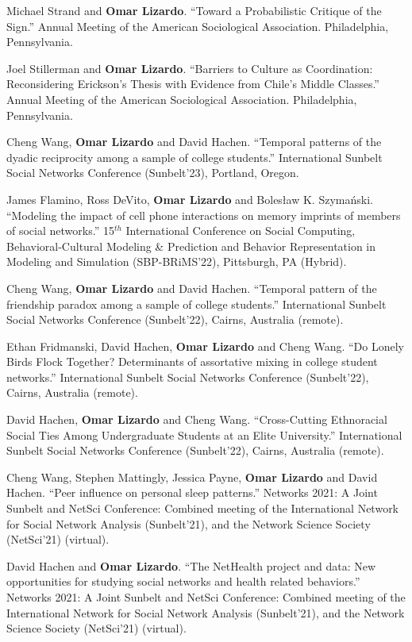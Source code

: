 \ind Michael Strand and {\bf Omar Lizardo}. ``Toward a Probabilistic Critique of the Sign.'' Annual Meeting of the American Sociological Association. Philadelphia, Pennsylvania. 

\ind Joel Stillerman and {\bf Omar Lizardo}. ``Barriers to Culture as Coordination: Reconsidering Erickson’s Thesis with Evidence from Chile’s Middle Classes.'' Annual Meeting of the American Sociological Association. Philadelphia, Pennsylvania. 

\ind Cheng Wang, {\bf Omar Lizardo} and David Hachen. ``Temporal patterns of the dyadic reciprocity among a sample of college students.'' International Sunbelt Social Networks Conference (Sunbelt'23), Portland, Oregon.	

\ind James Flamino, Ross DeVito, {\bf Omar Lizardo} and Boles\l{}aw K. Szyma\'{n}ski. ``Modeling the impact of cell phone interactions on memory imprints of members of social networks.'' 15$^{th}$ International Conference on Social Computing, Behavioral-Cultural Modeling \& Prediction and Behavior Representation in Modeling and Simulation (SBP-BRiMS'22), Pittsburgh, PA (Hybrid). 

\ind Cheng Wang, {\bf Omar Lizardo} and David Hachen. ``Temporal pattern of the friendship paradox among a sample of college students.''  International Sunbelt Social Networks Conference (Sunbelt'22), Cairns, Australia (remote).	

\ind Ethan Fridmanski, David Hachen, {\bf Omar Lizardo} and Cheng Wang. ``Do Lonely Birds Flock Together? Determinants of assortative mixing in college student networks.''	International Sunbelt Social Networks Conference (Sunbelt'22), Cairns, Australia (remote).

\ind David Hachen, {\bf Omar Lizardo} and Cheng Wang.	``Cross-Cutting Ethnoracial Social Ties Among Undergraduate Students at an Elite University.'' International Sunbelt Social Networks Conference (Sunbelt'22), Cairns, Australia (remote).

\ind Cheng Wang, Stephen Mattingly, Jessica Payne, {\bf Omar Lizardo} and David Hachen. ``Peer influence on personal sleep patterns.''	Networks 2021: A Joint Sunbelt and NetSci Conference: Combined meeting of the International Network for Social Network Analysis (Sunbelt'21), and the Network Science Society (NetSci'21) (virtual).

\ind David Hachen and {\bf Omar Lizardo}. ``The NetHealth project and data: New opportunities for studying social networks and health related behaviors.'' Networks 2021: A Joint Sunbelt and NetSci Conference: Combined meeting of the International Network for Social Network Analysis (Sunbelt'21), and the Network Science Society (NetSci'21) (virtual).

